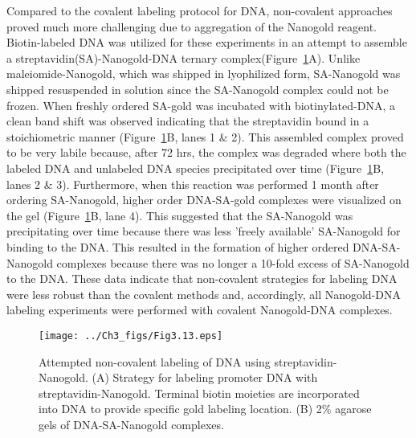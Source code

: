 \indent Compared to the covalent labeling protocol for DNA, non-covalent approaches proved much more challenging due to aggregation of the Nanogold reagent. Biotin-labeled DNA was utilized for these experiments in an attempt to assemble a streptavidin(SA)-Nanogold-DNA ternary complex(Figure~\ref{fig:Fig3.13}A). Unlike maleiomide-Nanogold, which was shipped in lyophilized form, SA-Nanogold was shipped resuspended in solution since the SA-Nanogold complex could not be frozen.  When freshly ordered SA-gold was incubated with biotinylated-DNA, a clean band shift was observed indicating that the streptavidin bound in a stoichiometric manner (Figure~\ref{fig:Fig3.13}B, lanes 1 \& 2).  This assembled complex proved to be very labile because, after 72 hrs, the complex was degraded where both the labeled DNA and unlabeled DNA species precipitated over time (Figure~\ref{fig:Fig3.13}B, lanes 2 \& 3). Furthermore, when this reaction was performed 1 month after ordering SA-Nanogold, higher order DNA-SA-gold complexes were visualized on the gel (Figure~\ref{fig:Fig3.13}B, lane 4). This suggested that the SA-Nanogold was precipitating over time because there was less 'freely available' SA-Nanogold for binding to the DNA. This resulted in the formation of higher ordered DNA-SA-Nanogold complexes because there was no longer a 10-fold excess of SA-Nanogold to the DNA. These data indicate that non-covalent strategies for labeling DNA were less robust than the covalent methods and, accordingly, all Nanogold-DNA labeling experiments were performed with covalent Nanogold-DNA complexes.\\
\begin{figure}
\centering
\texttt{[image: ../Ch3\_figs/Fig3.13.eps]}
\caption[Attempted non-covalent labeling of DNA using streptavidin-Nanogold]{Attempted non-covalent labeling of DNA using streptavidin-Nanogold. (A) Strategy for labeling promoter DNA with streptavidin-Nanogold. Terminal biotin moieties are incorporated into DNA to provide specific gold labeling location. (B) 2\% agarose gels of DNA-SA-Nanogold complexes. }
\label{fig:Fig3.13}
\end{figure}

